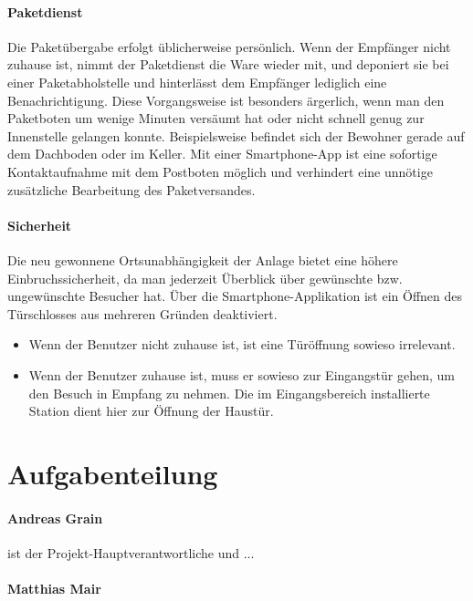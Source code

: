 \paragraph{Paketdienst}
Die Paketübergabe erfolgt üblicherweise persönlich.
Wenn der Empfänger nicht zuhause ist, nimmt der Paketdienst die Ware wieder mit, und deponiert sie bei einer Paketabholstelle und hinterlässt dem Empfänger lediglich eine Benachrichtigung.
Diese Vorgangsweise ist besonders ärgerlich, wenn man den Paketboten um wenige Minuten versäumt hat oder nicht schnell genug zur Innenstelle gelangen konnte.
Beispielsweise befindet sich der Bewohner gerade auf dem Dachboden oder im Keller.
Mit einer Smartphone-App ist eine sofortige Kontaktaufnahme mit dem Postboten möglich und verhindert eine unnötige zusätzliche Bearbeitung des Paketversandes.

\paragraph{Sicherheit}
Die neu gewonnene Ortsunabhängigkeit der Anlage bietet eine höhere Einbruchssicherheit, da man jederzeit Überblick über gewünschte bzw. ungewünschte Besucher hat.
Über die Smartphone-Applikation ist ein Öffnen des Türschlosses aus mehreren Gründen deaktiviert.
\begin{itemize}
    \item Wenn der Benutzer nicht zuhause ist, ist eine Türöffnung sowieso irrelevant.
    \item Wenn der Benutzer zuhause ist, muss er sowieso zur Eingangstür gehen, um den Besuch in Empfang zu nehmen. Die im Eingangsbereich installierte Station dient hier zur Öffnung der Haustür.
\end{itemize}

\section{Aufgabenteilung}
\paragraph{Andreas Grain} ist der Projekt-Hauptverantwortliche und ...

\paragraph{Matthias Mair}